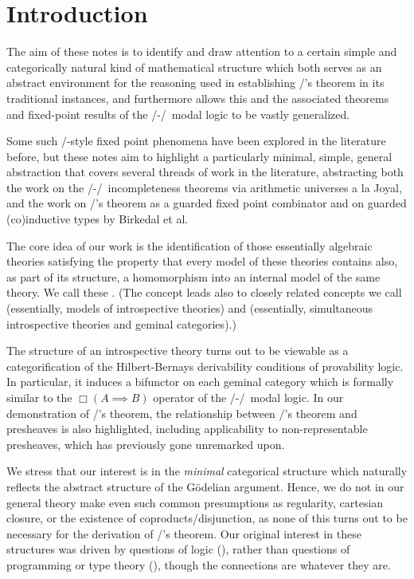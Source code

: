 \filestart

\section{Introduction}
The aim of these notes is to identify and draw attention to a certain simple and categorically natural kind of mathematical structure which both serves as an abstract environment for the reasoning used in establishing \Loeb/'s theorem in its traditional instances, and furthermore allows this and the associated theorems and fixed-point results of the \Goedel/-\Loeb/\ modal logic to be vastly generalized.

Some such \Loeb/-style fixed point phenomena have been explored in the literature before, but these notes aim to highlight a particularly minimal, simple, general abstraction that covers several threads of work in the literature, abstracting both the work on the \Goedel/-\Loeb/\ incompleteness theorems via arithmetic universes a la Joyal, and the work on \Loeb/'s theorem as a guarded fixed point combinator and on guarded (co)inductive types by Birkedal et al.

The core idea of our work is the identification of those essentially algebraic theories satisfying the property that every model of these theories contains also, as part of its structure, a homomorphism into an internal model of the same theory. We call these . (The concept leads also to closely related concepts we call  (essentially, models of introspective theories) and  (essentially, simultaneous introspective theories and geminal categories).)

The structure of an introspective theory turns out to be viewable as a categorification of the Hilbert-Bernays derivability conditions of provability logic. In particular, it induces a bifunctor on each geminal category which is formally similar to the $\Box(A \implies B)$ operator of the \Goedel/-\Loeb/\ modal logic. In our demonstration of \Loeb/'s theorem, the relationship between \Loeb/'s theorem and presheaves is also highlighted, including applicability to non-representable presheaves, which has previously gone unremarked upon.

We stress that our interest is in the \emph{minimal} categorical structure which naturally reflects the abstract structure of the G\"odelian argument. Hence, we do not in our general theory make even such common presumptions as regularity, cartesian closure, or the existence of coproducts/disjunction, as none of this turns out to be necessary for the derivation of \Loeb/'s theorem. Our original interest in these structures was driven by questions of logic (), rather than questions of programming or type theory (), though the connections are whatever they are.

